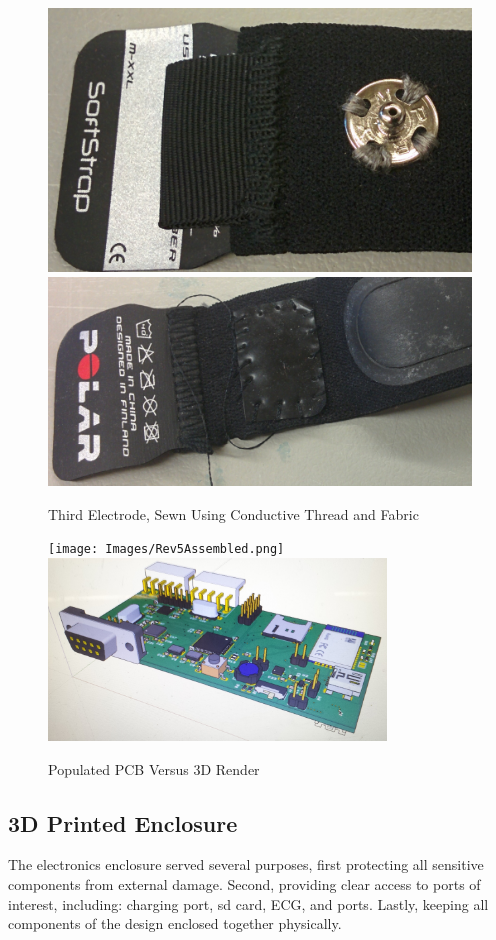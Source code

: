 \begin{figure}[ht]
\begin{center}
	\label{fig:polar_3rdSnap}
	\includegraphics[angle=0,scale=1,width=.51\textwidth]{Images/Polar_top.png} 
	\includegraphics[angle=0,scale=1,width=.51\textwidth]{Images/Polar_bottom.png}
	\caption{Third Electrode, Sewn Using Conductive Thread and Fabric}
\end{center}
\end{figure}

 

\begin{figure}[ht]
 \begin{center}
  \label{fig:PCBvsRender}
  \texttt{[image: Images/Rev5Assembled.png]} 
  \includegraphics[scale=1,width=0.8\textwidth]{Images/Rev5_prerender.png} 
  \caption{Populated PCB Versus 3D Render}
 
 \end{center}
\end{figure}

\subsection {3D Printed Enclosure}
The electronics enclosure served several purposes, first protecting all sensitive components from external damage. Second, providing clear access to ports of interest, including: charging port, sd card, ECG, and  ports. Lastly, keeping all components of the design enclosed together physically. 

